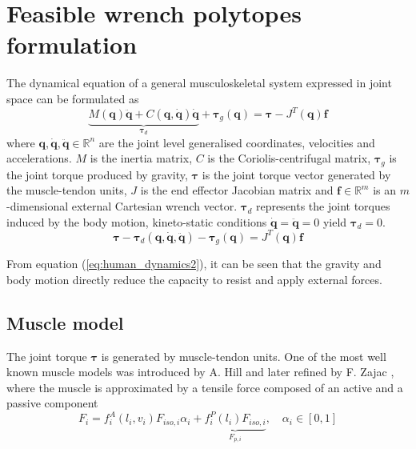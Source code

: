 \section{Feasible wrench polytopes formulation}
\label{ch:problem_formualtion}
The dynamical equation of a general musculoskeletal system expressed in joint space can be formulated as
\begin{equation}
    \underbrace{M(\bm{q})\ddot{\bm{q}} + C(\bm{q},\dot{\bm{q}})\dot{\bm{q}}}_{\bm{\tau}_d} + \bm{\tau}_g(\bm{q}) = \bm{\tau} - J^{T}(\bm{q})\bm{f}  
    \label{eq:human_dynamics}
\end{equation}
where $\bm{q},\dot{\bm{q}},\ddot{\bm{q}} \in \mathbb{R}^n $ are the joint level generalised coordinates, velocities and accelerations. $M$ is the inertia matrix, $C$ is the Coriolis-centrifugal matrix, $\bm{\tau}_g$ is the joint torque produced by gravity, $\bm{\tau}$ is the joint torque vector generated by the muscle-tendon units, $J$ is the end effector Jacobian matrix and $\bm{f} \in \mathbb{R}^m$ is an $m$-dimensional external Cartesian wrench vector. $\bm{\tau}_d$ represents the joint torques induced by the body motion, kineto-static conditions $\dot{\bm{q}}\!=\!\ddot{\bm{q}}\!=\!0$ yield $\bm{\tau}_d = 0$.  
\begin{equation}
    \bm{\tau} - \bm{\tau}_d(\bm{q},\dot{\bm{q}},\ddot{\bm{q}}) - \bm{\tau}_g(\bm{q}) =  J^{T}(\bm{q})\bm{f}
    \label{eq:human_dynamics2}
\end{equation}

From equation (\ref{eq:human_dynamics2}), it can be seen that the gravity and body motion directly reduce the capacity to resist and apply external forces. 

\subsection{Muscle model}
The joint torque $\bm{\tau}$ is generated by muscle-tendon units. One of the most well known muscle models was introduced by A. Hill \cite{hill1938heat} and later refined by F. Zajac \cite{zajac1989muscle}, where the muscle is approximated by a tensile force composed of an active and a passive component
\begin{equation}
    F_i = f^A_i(l_i,v_i)F_{iso,i} \alpha_i + \underbrace{f^P_{i}(l_i)F_{iso,i}}_{F_{p,i}}, \quad \alpha_i \in \left[0, 1\right]
\end{equation}

